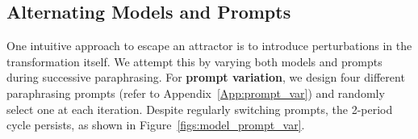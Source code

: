 %





\subsection{Alternating Models and Prompts}




One intuitive approach to escape an attractor is to introduce perturbations in the transformation itself. We attempt this by varying both models and prompts during successive paraphrasing. 
For \textbf{prompt variation}, we design four different paraphrasing prompts (refer to Appendix~\ref{App:prompt_var}) and randomly select one at each iteration. Despite regularly switching prompts, the 2-period cycle persists, as shown in Figure~\ref{figs:model_prompt_var}.

